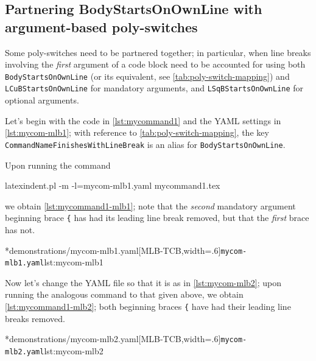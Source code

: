 \subsection{Partnering BodyStartsOnOwnLine with argument-based poly-switches}
	Some poly-switches need to be partnered together; in particular, when line breaks
	involving the \emph{first} argument of a code block need to be accounted for
	using both \texttt{BodyStartsOnOwnLine} (or its equivalent, see \vref{tab:poly-switch-mapping}) and \texttt{LCuBStartsOnOwnLine} for mandatory arguments, and
	\texttt{LSqBStartsOnOwnLine} for optional arguments.

	Let's begin with the code in \cref{lst:mycommand1} and the YAML settings in
	\cref{lst:mycom-mlb1}; with reference to \vref{tab:poly-switch-mapping}, the key
	\texttt{CommandNameFinishesWithLineBreak} is an alias for \texttt{BodyStartsOnOwnLine}.


	Upon running the command
	\begin{commandshell}
latexindent.pl -m -l=mycom-mlb1.yaml mycommand1.tex
\end{commandshell}
	we obtain \cref{lst:mycommand1-mlb1}; note that the \emph{second} mandatory argument
	beginning brace \lstinline!{! has had its leading line break removed, but that
	the \emph{first} brace has not.

        \begin{cmhtcbraster}[
            raster force size=false,
            raster column 1/.style={add to width=-1cm},
           ]
		\cmhlistingsfromfile[style=yaml-LST]*{demonstrations/mycom-mlb1.yaml}[MLB-TCB,width=.6\textwidth]{\texttt{mycom-mlb1.yaml}}{lst:mycom-mlb1}
        \end{cmhtcbraster}

	Now let's change the YAML file so that it is as in \cref{lst:mycom-mlb2}; upon running
	the analogous command to that given above, we obtain \cref{lst:mycommand1-mlb2}; both
	beginning braces \lstinline!{! have had their leading line breaks removed.

        \begin{cmhtcbraster}[
            raster force size=false,
            raster column 1/.style={add to width=-1cm},
           ]
		\cmhlistingsfromfile[style=yaml-LST]*{demonstrations/mycom-mlb2.yaml}[MLB-TCB,width=.6\textwidth]{\texttt{mycom-mlb2.yaml}}{lst:mycom-mlb2}
        \end{cmhtcbraster}

